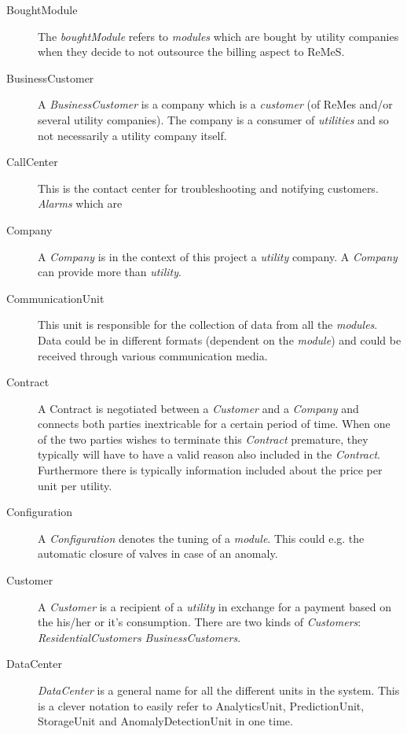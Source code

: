 \begin{description}
\item[BoughtModule] The \emph{boughtModule} refers to \emph{modules} which are
bought by utility companies when they decide to not outsource the billing aspect
to ReMeS.

\item[BusinessCustomer] A \emph{BusinessCustomer} is a company which is a
\emph{customer} (of ReMes and/or several utility companies). The company is a
consumer of \emph{utilities} and so not necessarily a utility company itself.

\item[CallCenter] This is the contact center for troubleshooting and notifying
customers. \emph{Alarms} which are 

\item[Company] A \emph{Company} is in the context of this project a
\emph{utility} company. A \emph{Company} can provide more than \emph{utility}. 

\item[CommunicationUnit] This unit is responsible for the collection of data
from all the \emph{modules}. Data could be in different formats (dependent on
the \emph{module}) and could be received through various communication media.

\item[Contract] A Contract is negotiated between a \emph{Customer} and a
\emph{Company} and connects both parties inextricable for a certain period of
time. When one of the two parties wishes to terminate this \emph{Contract}
premature, they typically will have to have a valid reason also included in the
\emph{Contract}. Furthermore there is typically information included about the
price per unit per utility.

\item[Configuration] A \emph{Configuration} denotes the tuning of a
\emph{module}. This could e.g. the automatic closure of valves in case of an
anomaly.

\item[Customer] A \emph{Customer} is a recipient of a \emph{utility} in exchange
for a payment based on the his/her or it's consumption. There are two kinds of
\emph{Customers}: \emph{ResidentialCustomers} \emph{BusinessCustomers}.

\item[DataCenter] \emph{DataCenter} is a general name for all the different
units in the system. This is a clever notation to easily refer to AnalyticsUnit,
PredictionUnit, StorageUnit and AnomalyDetectionUnit in one time.


\end{description}
